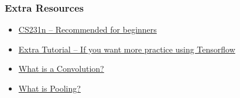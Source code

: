 \documentclass{beamer}
\begin{document}
\begin{frame}
  \frametitle{Extra Resources}
  \begin{itemize}
  \item \href{http://cs231n.stanford.edu/}{CS231n -- Recommended for beginners}
  \item \href{https://github.com/Hvass-Labs/TensorFlow-Tutorials}{Extra Tutorial -- If you want more practice using Tensorflow}
  \item \href{http://ufldl.stanford.edu/tutorial/supervised/FeatureExtractionUsingConvolution/}{What is a Convolution?}
  \item \href{http://ufldl.stanford.edu/tutorial/supervised/Pooling/}{What is Pooling?}
  \end{itemize}
\end{frame}
\end{document}
